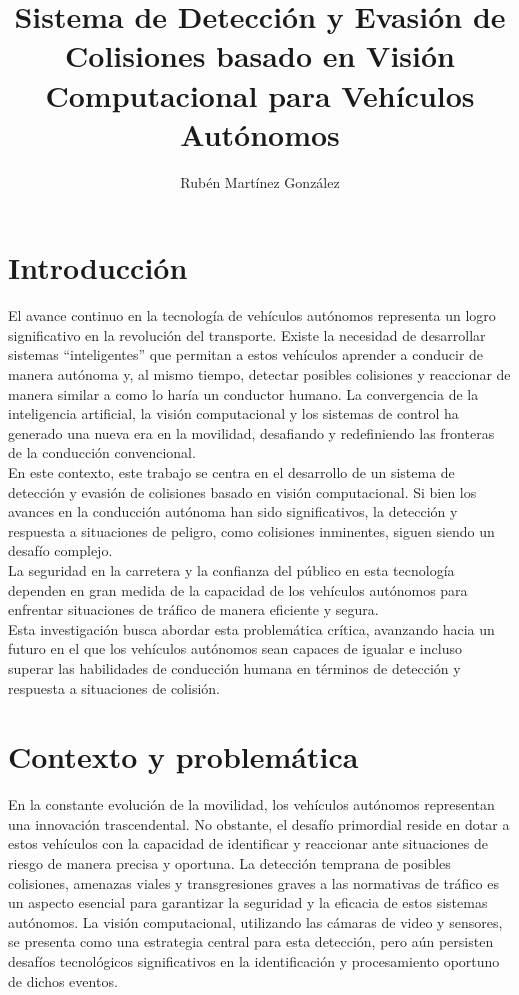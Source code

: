\documentclass[10pt,letterpaper,final]{article}
\begin{document}
    \title{Sistema de Detección y Evasión de Colisiones basado en Visión Computacional para Vehículos Autónomos}
    \author{Rubén Martínez González}
    \maketitle
    \clearpage
    \section*{Introducción}
    \noindent
    El avance continuo en la tecnología de vehículos autónomos representa un logro significativo en la revolución del transporte.
    Existe la necesidad de desarrollar sistemas ``inteligentes'' que permitan a estos vehículos aprender a conducir de manera autónoma y,
    al mismo tiempo, detectar posibles colisiones y reaccionar de manera similar a como lo haría un conductor humano.
    La convergencia de la inteligencia artificial, la visión computacional y los sistemas de control ha generado una nueva era en la movilidad,
    desafiando y redefiniendo las fronteras de la conducción convencional.\\ \newline
    En este contexto, este trabajo se centra en el desarrollo de un sistema de detección y evasión de colisiones basado en visión computacional.
    Si bien los avances en la conducción autónoma han sido significativos, la detección y respuesta a
    situaciones de peligro, como colisiones inminentes, siguen siendo un desafío complejo.\\ \newline
    La seguridad en la carretera y la confianza del público en esta tecnología dependen en gran medida de la capacidad
    de los vehículos autónomos para enfrentar situaciones de tráfico de manera eficiente y segura.\\ \newline
    Esta investigación busca abordar esta problemática crítica, avanzando hacia un futuro en el que los vehículos autónomos
    sean capaces de igualar e incluso superar las habilidades de conducción humana en términos de detección y respuesta
    a situaciones de colisión.
    \clearpage
    
    \section*{Contexto y problemática}
    \noindent En la constante evolución de la movilidad, los vehículos autónomos representan una innovación trascendental.
    No obstante, el desafío primordial reside en dotar a estos vehículos con la capacidad de identificar y reaccionar ante situaciones de riesgo
    de manera precisa y oportuna. La detección temprana de posibles colisiones, amenazas viales y transgresiones graves a las normativas de tráfico
    es un aspecto esencial para garantizar la seguridad y la eficacia de estos sistemas autónomos. La visión computacional,
    utilizando las cámaras de video y sensores, se presenta como una estrategia central para esta detección,
    pero aún persisten desafíos tecnológicos significativos en la identificación y procesamiento oportuno de dichos eventos.
    
\end{document}
